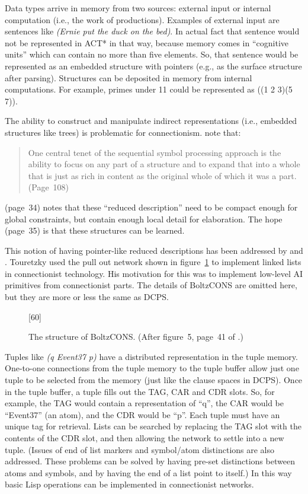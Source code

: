 Data types arrive in memory from two sources: external input or
internal computation (i.e., the work of productions).  Examples of
external input are sentences like {\em(Ernie put the duck on the
bed)}. In actual fact that sentence would not be represented in ACT*
in that way, because memory comes in ``cognitive units'' which can
contain no more than five elements.  So, that sentence would be
represented as an embedded structure with pointers (e.g., as the
surface structure after parsing). Structures can be deposited in
memory from internal computations.  For example, primes under 11 could
be represented as ((1 2 3)(5 7)).

The ability to construct and manipulate indirect representations
(i.e., embedded structures like trees) is problematic for
connectionism.   note that:
\begin{quotation}
One central tenet of the sequential symbol processing approach is the
ability to focus on any part of a structure and to expand that into a
whole that is just as rich in content as the original whole of which
it was a part. (Page~108)
\end{quotation}

 (page~34) notes that these ``reduced description''
need to be
compact enough for global constraints, but contain enough local
detail for elaboration.  The hope (page~35) is that these structures
can be learned.


This notion of having pointer-like reduced descriptions has been
addressed by
 and .  Touretzky used the pull out
network shown in figure~\ref{boltz} to implement linked lists in
connectionist technology.  His motivation for this was to implement
low-level AI primitives from connectionist parts.  The details
of BoltzCONS are omitted here, but they are more or less the same
as DCPS.  

\begin{figure}
[60]
\vspace{2.5 in}
\caption{The structure of BoltzCONS. (After figure~5, page~41 of
\protect{}.)}
\label{boltz}
\end{figure}

Tuples like {\em(q Event37 p)} have a distributed representation in
the tuple memory.  One-to-one connections from the tuple memory to the
tuple buffer allow just one tuple to be selected from the memory (just
like the clause spaces in DCPS).  Once in the tuple buffer, a tuple
fills out the TAG, CAR and CDR slots.  So, for example, the TAG would
contain a representation of ``q'', the CAR would be ``Event37'' (an
atom), and the CDR would be ``p''.  Each tuple must have an unique tag
for retrieval.  Lists can be searched by replacing the TAG slot with
the contents of the CDR slot, and then allowing the network to settle
into a new tuple.  (Issues of end of list markers and symbol/atom
distinctions are also addressed.  These problems can be solved by
having pre-set distinctions between atoms and symbols, and by having
the end of a list point to itself.) In this way basic Lisp operations
can be implemented in connectionist networks.

